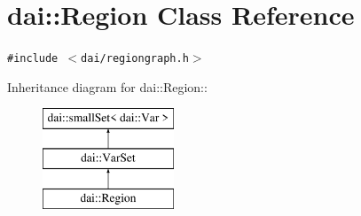 \hypertarget{classdai_1_1Region}{
\section{dai::Region Class Reference}
\label{classdai_1_1Region}
}
{\tt \#include $<$dai/regiongraph.h$>$}

Inheritance diagram for dai::Region::\begin{figure}[H]
\begin{center}
\leavevmode
\includegraphics[height=3cm]{classdai_1_1Region}
\end{center}
\end{figure}


